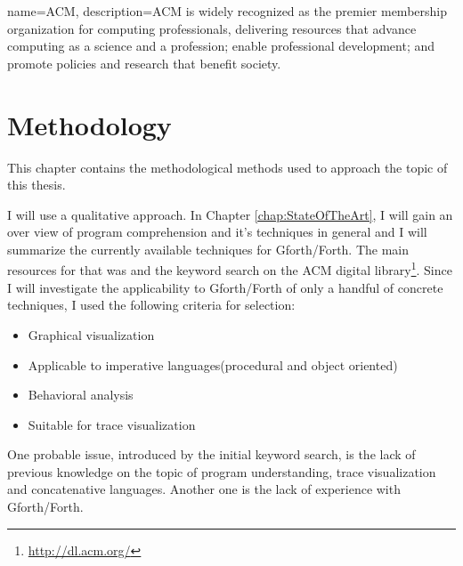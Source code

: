 {
  name={ACM},
  description={ACM is widely recognized as the premier membership organization for computing professionals, delivering resources that advance computing as a science and a profession; enable professional development; and promote policies and research that benefit society.}
}


\chapter{Methodology}
\label{chap:Methodology}

This chapter contains the methodological methods used to approach the topic of this thesis.

I will use a qualitative approach. In Chapter \ref{chap:StateOfTheArt}, I will gain an over view of program comprehension and it's techniques in general and I will summarize the currently available techniques for Gforth/Forth. The main resources for that was \cite{Cornelissen:2009:SSP:1638616.1639301} and the keyword search on the \gls{ACM} digital library\footnote{\url{http://dl.acm.org/}}.
Since I will investigate the applicability to Gforth/Forth of only a handful of concrete techniques, I used the following criteria for selection:
\begin{itemize}
\item Graphical visualization 
\item Applicable to imperative languages(procedural and object oriented)
\item Behavioral analysis
\item Suitable for trace visualization
\end{itemize}
One probable issue, introduced by the initial keyword search, is the lack of previous knowledge on the topic of program understanding, trace visualization and concatenative languages. Another one is the lack of experience with Gforth/Forth.

